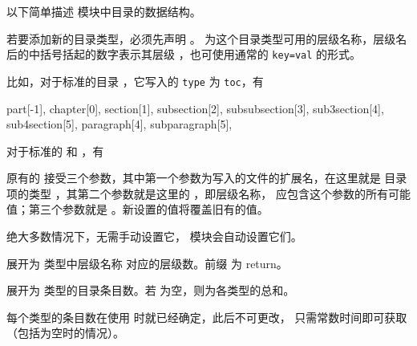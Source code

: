 \documentclass{cusdoc}
\begin{document}
以下简单描述  模块中目录的数据结构。

\begin{function}{\addcombinedlisttype}
  \begin{syntax}
    \V\addcombinedlisttype {} 
  \end{syntax}
若要添加新的目录类型，必须先声明 。 为这个目录类型可用的层级名称，层级名后的中括号括起的数字表示其层级 ，也可使用通常的 \texttt{key=val} 的形式。
\end{function}

比如，对于标准的目录 ，它写入的 \texttt{type} 为 \texttt{toc}，有
\begin{xample}
  { 
    part[-1], 
    chapter[0], 
    section[1], subsection[2], subsubsection[3], 
    sub3section[4], sub4section[5], 
    paragraph[4], subparagraph[5], 
  }
\stopxamplecode
\xamplecode \medskip
\end{xample}

对于标准的  和 ，有
\begin{xample}
\stopxamplecode 
\xamplecode \medskip
\end{xample}

原有的  接受三个参数，其中第一个参数为写入的文件的扩展名，在这里就是
目录项的类型 ，其第二个参数就是这里的 ，即层级名称， 应包含这个参数的所有可能值；第三个参数就是 。新设置的值将覆盖旧有的值。

绝大多数情况下，无需手动设置它， 模块会自动设置它们。

\begin{function}[EXP]{\retcbltypelevel}
  \begin{syntax}
    \V\retcbltypelevel {} 
  \end{syntax}
展开为  类型中层级名称  对应的层级数。前缀  为 return。
\end{function}

\begin{function}[EXP]{\retcbltotalcounts}
  \begin{syntax}
    \V\retcbltotalcounts {}
  \end{syntax}
展开为  类型的目录条目数。若  为空，则为各类型的总和。

每个类型的条目数在使用  时就已经确定，此后不可更改，
只需常数时间即可获取（包括为空时的情况）。
\end{function}
\end{document}
